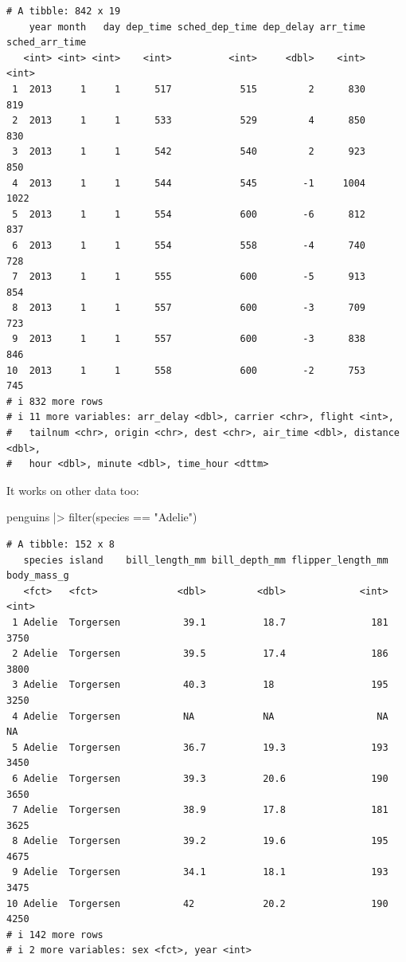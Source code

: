 \documentclass[
  letterpaper,
  DIV=11,
  numbers=noendperiod]{scrreprt}
\newenvironment{Shaded}{\begin{snugshade}}{\end{snugshade}}
\newcommand{\FunctionTok}[1]{\textcolor[rgb]{0.28,0.35,0.67}{#1}}
\newcommand{\NormalTok}[1]{\textcolor[rgb]{0.00,0.23,0.31}{#1}}
\newcommand{\SpecialCharTok}[1]{\textcolor[rgb]{0.37,0.37,0.37}{#1}}
\newcommand{\StringTok}[1]{\textcolor[rgb]{0.13,0.47,0.30}{#1}}
\begin{document}
\begin{verbatim}
# A tibble: 842 x 19
    year month   day dep_time sched_dep_time dep_delay arr_time sched_arr_time
   <int> <int> <int>    <int>          <int>     <dbl>    <int>          <int>
 1  2013     1     1      517            515         2      830            819
 2  2013     1     1      533            529         4      850            830
 3  2013     1     1      542            540         2      923            850
 4  2013     1     1      544            545        -1     1004           1022
 5  2013     1     1      554            600        -6      812            837
 6  2013     1     1      554            558        -4      740            728
 7  2013     1     1      555            600        -5      913            854
 8  2013     1     1      557            600        -3      709            723
 9  2013     1     1      557            600        -3      838            846
10  2013     1     1      558            600        -2      753            745
# i 832 more rows
# i 11 more variables: arr_delay <dbl>, carrier <chr>, flight <int>,
#   tailnum <chr>, origin <chr>, dest <chr>, air_time <dbl>, distance <dbl>,
#   hour <dbl>, minute <dbl>, time_hour <dttm>
\end{verbatim}

It works on other data too:

\begin{Shaded}
\begin{Highlighting}[]
\NormalTok{penguins }\SpecialCharTok{|\textgreater{}}
  \FunctionTok{filter}\NormalTok{(species }\SpecialCharTok{==} \StringTok{"Adelie"}\NormalTok{)}
\end{Highlighting}
\end{Shaded}

\begin{verbatim}
# A tibble: 152 x 8
   species island    bill_length_mm bill_depth_mm flipper_length_mm body_mass_g
   <fct>   <fct>              <dbl>         <dbl>             <int>       <int>
 1 Adelie  Torgersen           39.1          18.7               181        3750
 2 Adelie  Torgersen           39.5          17.4               186        3800
 3 Adelie  Torgersen           40.3          18                 195        3250
 4 Adelie  Torgersen           NA            NA                  NA          NA
 5 Adelie  Torgersen           36.7          19.3               193        3450
 6 Adelie  Torgersen           39.3          20.6               190        3650
 7 Adelie  Torgersen           38.9          17.8               181        3625
 8 Adelie  Torgersen           39.2          19.6               195        4675
 9 Adelie  Torgersen           34.1          18.1               193        3475
10 Adelie  Torgersen           42            20.2               190        4250
# i 142 more rows
# i 2 more variables: sex <fct>, year <int>
\end{verbatim}
\end{document}
